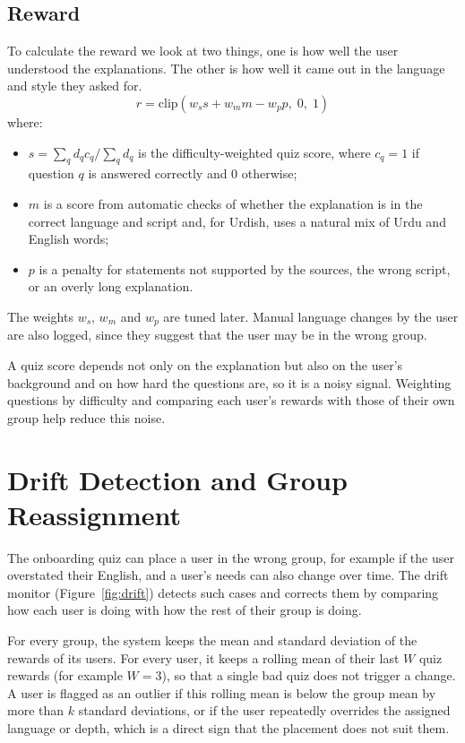 \documentclass{FastFyp}
\begin{document}
\subsection{Reward}
To calculate the reward we look at two things, one is how well the user understood the explanations. The other is how well it came out in the language and style they asked for.
\begin{equation}
    r = \mathrm{clip}\left(w_s s + w_m m - w_p p,\; 0,\; 1\right)
    \label{eq:reward}
\end{equation}
where:
\begin{itemize}
    \item $s = \sum_q d_q c_q \big/ \sum_q d_q$ is the difficulty-weighted quiz score, where $c_q = 1$ if question $q$ is answered correctly and $0$ otherwise;
    \item $m$ is a score from automatic checks of whether the explanation is in the correct language and script and, for Urdish, uses a natural mix of Urdu and English words;
    \item $p$ is a penalty for statements not supported by the sources, the wrong script, or an overly long explanation.
\end{itemize}
The weights $w_s$, $w_m$ and $w_p$ are tuned later. Manual language changes by the user are also logged, since they suggest that the user may be in the wrong group.
 
A quiz score depends not only on the explanation but also on the user's background and on how hard the questions are, so it is a noisy signal. Weighting questions by difficulty and comparing each user's rewards with those of their own group help reduce this noise.

 \section{Drift Detection and Group Reassignment}
\label{sec:drift}
The onboarding quiz can place a user in the wrong group, for example if the user overstated their English, and a user's needs can also change over time. The drift monitor (Figure~\ref{fig:drift}) detects such cases and corrects them by comparing how each user is doing with how the rest of their group is doing.

For every group, the system keeps the mean and standard deviation of the rewards of its users. For every user, it keeps a rolling mean of their last $W$ quiz rewards (for example $W=3$), so that a single bad quiz does not trigger a change. A user is flagged as an outlier if this rolling mean is below the group mean by more than $k$ standard deviations, or if the user repeatedly overrides the assigned language or depth, which is a direct sign that the placement does not suit them.
\end{document}
